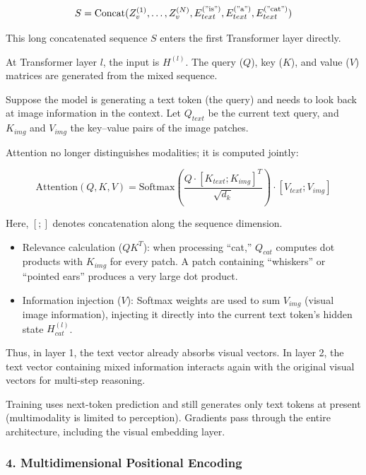 \[
S=\mathrm{Concat}(Z_v^{(1)},\ldots,Z_v^{(N)},E_{text}^{(\mathrm{"is"})},E_{text}^{(\mathrm{"a"})},E_{text}^{(\mathrm{"cat"})})
\]

This long concatenated sequence \(S\) enters the first Transformer layer directly.

At Transformer layer \(l\), the input is \(H^{(l)}\). The query (\(Q\)), key (\(K\)), and value (\(V\)) matrices are generated from the mixed sequence.

Suppose the model is generating a text token (the query) and needs to look back at image information in the context. Let \(Q_{text}\) be the current text query, and \(K_{img}\) and \(V_{img}\) the key--value pairs of the image patches.

Attention no longer distinguishes modalities; it is computed jointly:

\[
\mathrm{Attention}(Q,K,V)=\mathrm{Softmax}\left(\frac{Q\cdot [K_{text};K_{img}]^T}{\sqrt{d_k}}\right)\cdot [V_{text};V_{img}]
\]

Here, \([;]\) denotes concatenation along the sequence dimension.

\begin{itemize}
\tightlist
\item
  Relevance calculation (\(QK^T\)): when processing ``cat,'' \(Q_{cat}\) computes dot products with \(K_{img}\) for every patch. A patch containing ``whiskers'' or ``pointed ears'' produces a very large dot product.
\item
  Information injection (\(V\)): Softmax weights are used to sum \(V_{img}\) (visual image information), injecting it directly into the current text token's hidden state \(H_{cat}^{(l)}\).
\end{itemize}

Thus, in layer 1, the text vector already absorbs visual vectors. In layer 2, the text vector containing mixed information interacts again with the original visual vectors for multi-step reasoning.

Training uses next-token prediction and still generates only text tokens at present (multimodality is limited to perception). Gradients pass through the entire architecture, including the visual embedding layer.

\hypertarget{multidimensional-positional-encoding}{%
\subsubsection{4. Multidimensional Positional Encoding}\label{multidimensional-positional-encoding}}

